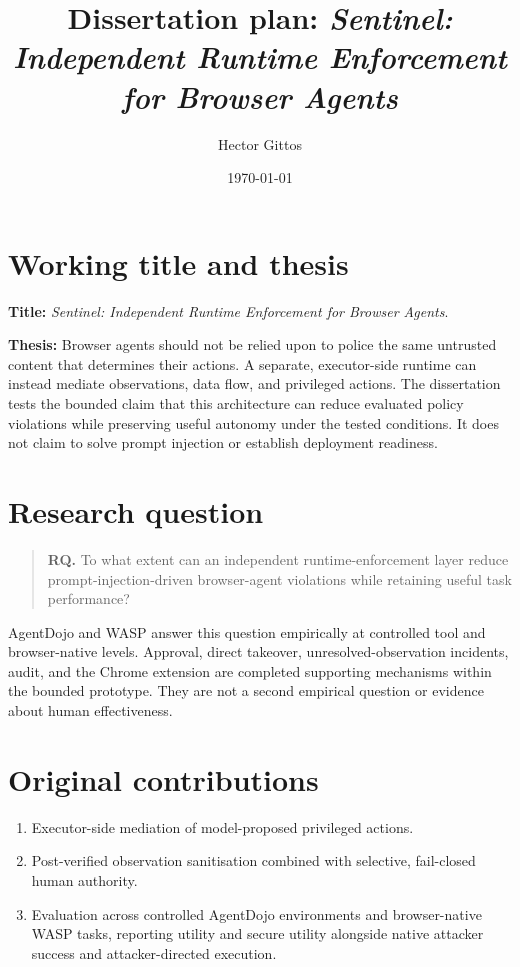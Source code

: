 \documentclass[10pt,a4paper]{article}
\title{Dissertation plan: \emph{Sentinel: Independent Runtime Enforcement for Browser Agents}}
\author{Hector Gittos}
\date{\today}
\begin{document}
\maketitle

\section{Working title and thesis}

\textbf{Title:} \emph{Sentinel: Independent Runtime Enforcement for Browser
Agents}.

\textbf{Thesis:} Browser agents should not be relied upon to police the same
untrusted content that determines their actions.  A separate, executor-side
runtime can instead mediate observations, data flow, and privileged actions.
The dissertation tests the bounded claim that this architecture can reduce
evaluated policy violations while preserving useful autonomy under the tested
conditions.  It does not claim to solve prompt injection or establish
deployment readiness.

\section{Research question}

\begin{quote}
\textbf{RQ.} To what extent can an independent runtime-enforcement layer reduce
prompt-injection-driven browser-agent violations while retaining useful task performance?
\end{quote}

AgentDojo and WASP answer this question empirically at controlled tool and
browser-native levels. Approval, direct takeover, unresolved-observation
incidents, audit, and the Chrome extension are completed supporting mechanisms
within the bounded prototype. They are not a second empirical question or
evidence about human effectiveness.

\section{Original contributions}

\begin{enumerate}
  \item Executor-side mediation of model-proposed privileged actions.
  \item Post-verified observation sanitisation combined with selective,
  fail-closed human authority.
  \item Evaluation across controlled AgentDojo environments and browser-native
  WASP tasks, reporting utility and secure utility alongside native attacker
  success and attacker-directed execution.
\end{enumerate}
\end{document}
